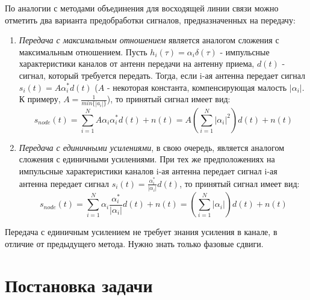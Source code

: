 \documentclass[a4paper,12pt,oneside]{scrartcl}
\begin{document}
По аналогии с методами объединения для восходящей линии связи можно отметить два варианта предобработки сигналов, предназначенных на передачу:

\begin{enumerate}
\item \textit{Передача с максимальным отношением} является аналогом сложения с максимальным отношением. Пусть $h_i\left(\tau\right)=\alpha_i\delta\left(\tau\right)$ - импульсные характеристики каналов от антенн передачи на антенну приема, $d\left(t\right)$ - сигнал, который требуется передать. 
Тогда, если i-ая антенна передает сигнал $s_i\left(t\right) = A\alpha^*_id\left(t\right)$ 
\newline ($A$ - некоторая константа, компенсирующая малость $|\alpha_i|$. К примеру, $A = \frac{1}{min\{|a_i|\} }$), то принятый сигнал имеет вид:
\begin{equation}
s_{node}\left(t\right)=\sum\limits_{i=1}^N A\alpha_i\alpha^*_id\left(t\right) + n\left(t\right) = A\left(\sum\limits_{i=1}^N |\alpha_i|^2\right)d\left(t\right) + n\left(t\right)
\end{equation} 
\item \textit{Передача с единичными усилениями}, в свою очередь, является аналогом сложения с единичными усилениями. 
При тех же предположениях на импульсные характеристики каналов i-ая антенна передает сигнал i-ая антенна передает сигнал $s_i\left(t\right) = \frac{\alpha^*_i}{|\alpha_i|}d\left(t\right)$, то принятый сигнал имеет вид:
\begin{equation}
s_{node}\left(t\right)=\sum\limits_{i=1}^N \alpha_i\frac{\alpha^*_i}{|\alpha_i|}d\left(t\right) + n\left(t\right) = \left(\sum\limits_{i=1}^N |\alpha_i|\right)d\left(t\right) + n\left(t\right)
\label{eq:egtsignal}
\end{equation}
\end{enumerate}
Передача с единичным усилением не требует знания усиления в канале, в отличие от предыдущего метода. Нужно знать только фазовые сдвиги.  

\clearpage

\section{Постановка задачи}
\end{document}
